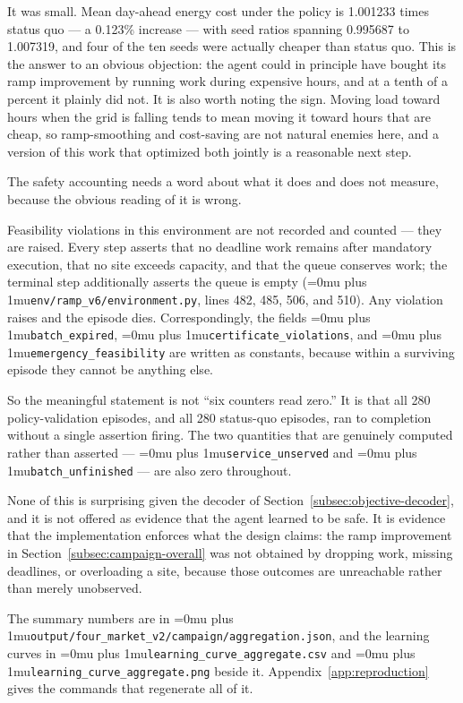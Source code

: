 ﻿\documentclass[12pt]{article}
\newcommand{\codepath}[1]{{\Urlmuskip=0mu plus 1mu\relax\nolinkurl{#1}}}
\begin{document}
It was small. Mean day-ahead energy cost under the policy is 1.001233 times
status quo --- a 0.123\% increase --- with seed ratios spanning 0.995687 to
1.007319, and four of the ten seeds were actually cheaper than status quo. This
is the answer to
an obvious objection: the agent could in principle have bought its ramp
improvement by running work during expensive hours, and at a tenth of a percent
it plainly did not. It is also worth noting the sign. Moving load toward hours
when the grid is falling tends to mean moving it toward hours that are cheap,
so ramp-smoothing and cost-saving are not natural enemies here, and a version of
this work that optimized both jointly is a reasonable next step.

The safety accounting needs a word about what it does and does not measure,
because the obvious reading of it is wrong.

Feasibility violations in this environment are not recorded and counted --- they
are raised. Every step asserts that no deadline work remains after mandatory
execution, that no site exceeds capacity, and that the queue conserves work;
the terminal step additionally asserts the queue is empty
(\codepath{env/ramp_v6/environment.py}, lines 482, 485, 506, and 510). Any
violation raises and the episode dies. Correspondingly, the fields
\codepath{batch_expired}, \codepath{certificate_violations}, and
\codepath{emergency_feasibility} are written as constants, because within a
surviving episode they cannot be anything else.

So the meaningful statement is not ``six counters read zero.'' It is that all
280 policy-validation episodes, and all 280 status-quo episodes, ran to
completion without a single assertion firing. The two quantities that are
genuinely computed rather than asserted --- \codepath{service_unserved} and
\codepath{batch_unfinished} --- are also zero throughout.

None of this is surprising given the decoder of
Section~\ref{subsec:objective-decoder}, and it is not offered as evidence that
the agent learned to be safe. It is evidence that the implementation enforces
what the design claims: the ramp improvement in
Section~\ref{subsec:campaign-overall} was not obtained by dropping work,
missing deadlines, or overloading a site, because those outcomes are
unreachable rather than merely unobserved.

The summary numbers are in
\codepath{output/four_market_v2/campaign/aggregation.json}, and the learning
curves in \codepath{learning_curve_aggregate.csv} and
\codepath{learning_curve_aggregate.png} beside it.
Appendix~\ref{app:reproduction} gives the commands that regenerate all of it.
\end{document}
